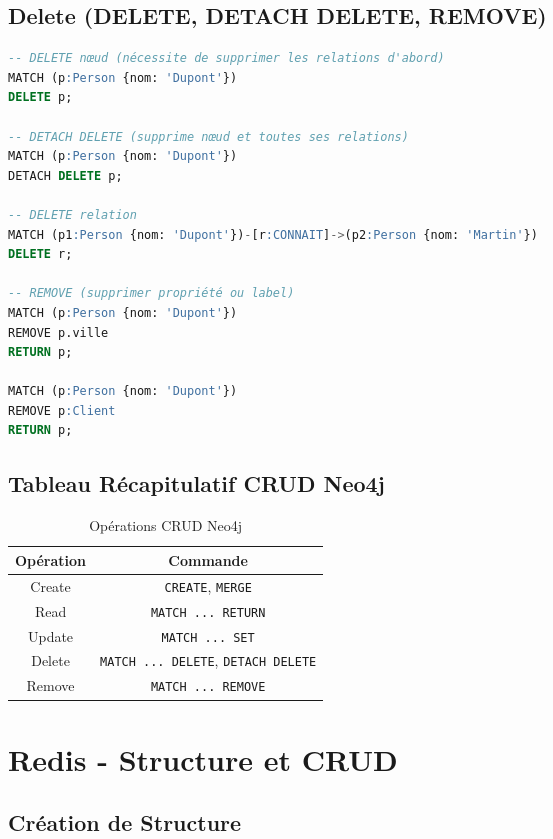 \documentclass[11pt,a4paper]{article}
\begin{document}
\subsection{Delete (DELETE, DETACH DELETE, REMOVE)}

\begin{lstlisting}[language=SQL]
-- DELETE nœud (nécessite de supprimer les relations d'abord)
MATCH (p:Person {nom: 'Dupont'})
DELETE p;

-- DETACH DELETE (supprime nœud et toutes ses relations)
MATCH (p:Person {nom: 'Dupont'})
DETACH DELETE p;

-- DELETE relation
MATCH (p1:Person {nom: 'Dupont'})-[r:CONNAIT]->(p2:Person {nom: 'Martin'})
DELETE r;

-- REMOVE (supprimer propriété ou label)
MATCH (p:Person {nom: 'Dupont'})
REMOVE p.ville
RETURN p;

MATCH (p:Person {nom: 'Dupont'})
REMOVE p:Client
RETURN p;
\end{lstlisting}

\subsection{Tableau Récapitulatif CRUD Neo4j}

\begin{table}[h]
\centering
\begin{tabular}{|c|c|}
\hline
\textbf{Opération} & \textbf{Commande} \\
\hline
Create & \texttt{CREATE}, \texttt{MERGE} \\
\hline
Read & \texttt{MATCH ... RETURN} \\
\hline
Update & \texttt{MATCH ... SET} \\
\hline
Delete & \texttt{MATCH ... DELETE}, \texttt{DETACH DELETE} \\
\hline
Remove & \texttt{MATCH ... REMOVE} \\
\hline
\end{tabular}
\caption{Opérations CRUD Neo4j}
\end{table}

\newpage

\section{Redis - Structure et CRUD}

\subsection{Création de Structure}
\end{document}
